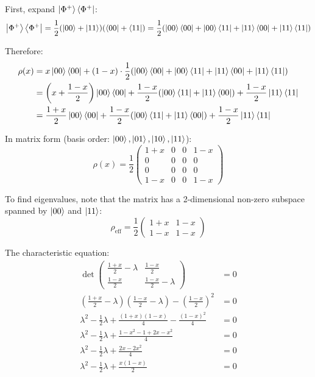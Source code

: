 \documentclass[11pt]{article}
\begin{document}
First, expand $\ket{\Phi^+}\bra{\Phi^+}$:
\begin{equation*}
    \ket{\Phi^+}\bra{\Phi^+} = \frac{1}{2}(\ket{00} + \ket{11})(\bra{00} + \bra{11}) = \frac{1}{2}(\ket{00}\bra{00} + \ket{00}\bra{11} + \ket{11}\bra{00} + \ket{11}\bra{11})
\end{equation*}

Therefore:
\begin{align*}
    \rho(x) &= x \ket{00}\bra{00} + (1-x) \cdot \frac{1}{2}(\ket{00}\bra{00} + \ket{00}\bra{11} + \ket{11}\bra{00} + \ket{11}\bra{11}) \\
    &= \left(x + \frac{1-x}{2}\right)\ket{00}\bra{00} + \frac{1-x}{2}(\ket{00}\bra{11} + \ket{11}\bra{00}) + \frac{1-x}{2}\ket{11}\bra{11} \\
    &= \frac{1+x}{2}\ket{00}\bra{00} + \frac{1-x}{2}(\ket{00}\bra{11} + \ket{11}\bra{00}) + \frac{1-x}{2}\ket{11}\bra{11}
\end{align*}

In matrix form (basis order: $\ket{00}, \ket{01}, \ket{10}, \ket{11}$):
\begin{equation*}
    \rho(x) = \frac{1}{2}\begin{pmatrix} 
    1+x & 0 & 0 & 1-x \\ 
    0 & 0 & 0 & 0 \\ 
    0 & 0 & 0 & 0 \\ 
    1-x & 0 & 0 & 1-x 
    \end{pmatrix}
\end{equation*}

To find eigenvalues, note that the matrix has a 2-dimensional non-zero subspace spanned by $\ket{00}$ and $\ket{11}$:
\begin{equation*}
    \rho_{\text{eff}} = \frac{1}{2}\begin{pmatrix} 1+x & 1-x \\ 1-x & 1-x \end{pmatrix}
\end{equation*}

The characteristic equation:
\begin{align*}
    \det\begin{pmatrix} \frac{1+x}{2}-\lambda & \frac{1-x}{2} \\ \frac{1-x}{2} & \frac{1-x}{2}-\lambda \end{pmatrix} &= 0 \\
    \left(\frac{1+x}{2}-\lambda\right)\left(\frac{1-x}{2}-\lambda\right) - \left(\frac{1-x}{2}\right)^2 &= 0 \\
    \lambda^2 - \frac{1}{2}\lambda + \frac{(1+x)(1-x)}{4} - \frac{(1-x)^2}{4} &= 0 \\
    \lambda^2 - \frac{1}{2}\lambda + \frac{1-x^2 - 1 + 2x - x^2}{4} &= 0 \\
    \lambda^2 - \frac{1}{2}\lambda + \frac{2x - 2x^2}{4} &= 0 \\
    \lambda^2 - \frac{1}{2}\lambda + \frac{x(1-x)}{2} &= 0
\end{align*}
\end{document}

